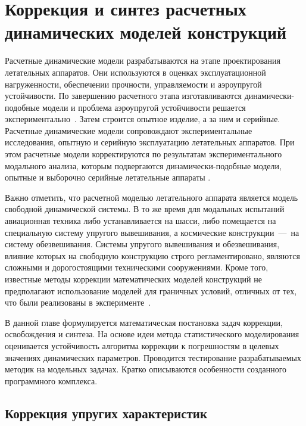 \chapter{Коррекция и синтез расчетных динамических моделей конструкций}

Расчетные динамические модели разрабатываются на этапе проектирования летательных аппаратов. Они используются в оценках эксплуатационной нагруженности, обеспечении прочности, управляемости и аэроупругой устойчивости. По завершению расчетного этапа изготавливаются динамически-подобные модели и проблема аэроупругой устойчивости решается экспериментально~\cite{lib:modelUpdating:Karklje:force}. Затем строится опытное изделие, а за ним и серийные. Расчетные динамические модели сопровождают экспериментальные исследования, опытную и серийную эксплуатацию летательных аппаратов. При этом расчетные модели корректируются по результатам экспериментального модального анализа, которым подвергаются динамически-подобные модели, опытные и выборочно серийные летательные аппараты \cite{lib:modelUpdating:Karklje:force, lib:modelUpdating:Berns:monophase}.

Важно отметить, что расчетной моделью летательного аппарата является модель свободной динамической системы. В то же время для модальных испытаний авиационная техника либо устанавливается на шасси, либо помещается на специальную систему упругого вывешивания, а космические конструкции~---~на систему обезвешивания. Системы упругого вывешивания и обезвешивания, влияние которых на свободную конструкцию строго регламентировано, являются сложными и дорогостоящими техническими сооружениями. Кроме того, известные методы коррекции математических моделей конструкций не предполагают использование моделей для граничных условий, отличных от тех, что были реализованы в эксперименте~\cite{lib:modelUpdating:Kuznecov, lib:modelUpdating:Luo, lib:modelUpdating:Jang, lib:modelUpdating:Asgarieh, lib:modelUpdating:Sanayei, lib:modelUpdating:Wang}.

В данной главе формулируется математическая постановка задач коррекции, освобождения и синтеза. На основе идеи метода статистического моделирования оценивается устойчивость алгоритма коррекции к погрешностям в целевых значениях динамических параметров. Проводится тестирование разрабатываемых методик на модельных задачах. Кратко описываются особенности созданного программного комплекса.

\section{Коррекция упругих характеристик} \label{struct:updating}

